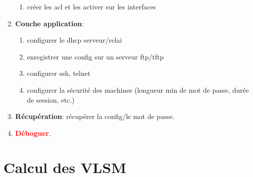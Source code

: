\documentclass[a4paper]{article}
\begin{document}
\begin{enumerate}
\begin{enumerate}
        \item créer les acl et les activer sur les interfaces
    \end{enumerate}
    \item \textbf{Couche application}:
    \begin{enumerate}
        \item configurer le dhcp serveur/relai
        \item enregistrer une config sur un serveur ftp/tftp
        \item configurer ssh, telnet
        \item configurer la sécurité des machines (longueur min de mot de passe, durée de session, etc.)
    \end{enumerate}
    \item \textbf{Récupération}: récupérer la config/le mot de passe.
    \item \textcolor{red}{\textbf{Déboguer}}.
\end{enumerate}










\section{Calcul des VLSM}
\end{document}
